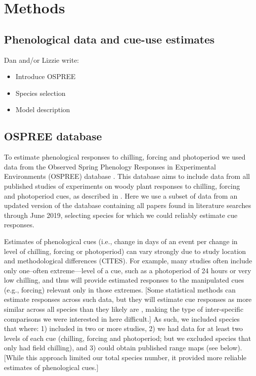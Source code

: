 \documentclass[12pt]{article}\usepackage[]{graphicx}\usepackage[]{color}
\begin{document}
\section*{Methods}
\subsection*{Phenological data and cue-use estimates}
Dan and/or Lizzie write:
\begin{itemize}
\item Introduce OSPREE
\item Species selection
\item Model description
\end{itemize}

\subsection*{OSPREE database}
To estimate phenological responses to chilling, forcing and photoperiod we used data from the Observed Spring Phenology Responses in Experimental Environments (OSPREE) database  \citep{wolkovich2019}. This database aims to include data from all published studies of experiments on woody plant responses to chilling, forcing and photoperiod cues, as described in \citet{ospreebbms}. Here we use a subset of data from an updated version of the database containing all papers found in literature searches through June 2019, selecting species for which we could reliably estimate cue responses. 

Estimates of phenological cues (i.e., change in days of an event per change in level of chilling, forcing or photoperiod) can vary strongly due to study location and methodological differences (CITES). For example, many studies often include only one--often extreme---level of a cue, such as a photoperiod of 24 hours or very low chilling, and thus will provide estimated responses to the manipulated cues (e.g., forcing) relevant only in those extremes. [Some statistical methods can estimate responses across such data, but they will estimate cue responses as more similar across all species than they likely are \citep[see][for example]{ospreebbms}, making the type of inter-specific comparisons we were interested in here difficult.] As such, we included species that where: 1) included in two or more studies, 2) we had data for at least two levels of each cue (chilling, forcing and photoperiod; but we excluded species that only had field chilling), and 3) could obtain published range maps (see below). [While this approach limited our total species number, it provided more reliable estimates of phenological cues.]
\end{document}
